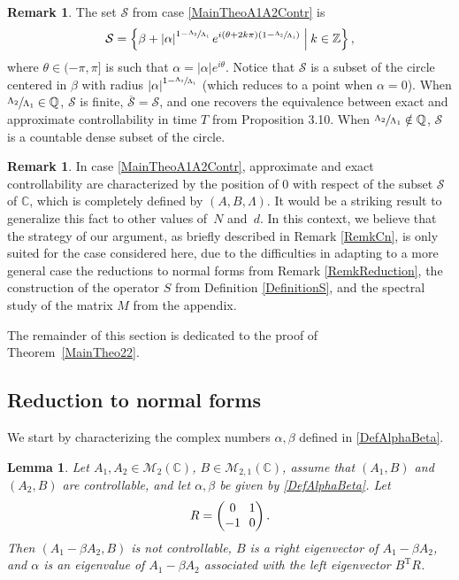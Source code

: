 \documentclass[JEP,XML,SOM,Unicode]{cedram}
\theoremstyle{plain}
\newtheorem{lemm}[theo]{Lemma}
\theoremstyle{definition}
\newtheorem{remk}[theo]{Remark}
\newcommand{\midsuchthat}{\;\middle|\:}
\newcommand{\transp}{{\scriptscriptstyle\mathrm{T}}}
\newcommand{\abs}[1]{\left\lvert #1\right \rvert}
\begin{document}
\begin{remk}
The set $\mathcal S$ from case \eqref{MainTheoA1A2Contr} is
\[
\mathcal S = \left\{\beta + \abs{\alpha}^{1 - \sfrac{\Lambda_2}{\Lambda_1}} e^{i (\theta + 2 k \pi)\left(1 - \sfrac{\Lambda_2}{\Lambda_1}\right)} \midsuchthat k \in \mathbb Z\right\},
\]
where $\theta \in (-\pi, \pi]$ is such that $\alpha = \abs{\alpha} e^{i\theta}$. Notice that $\mathcal S$ is a subset of the circle centered in $\beta$ with radius $\abs{\alpha}^{1 - \sfrac{\Lambda_2}{\Lambda_1}}$ (which reduces to a point when $\alpha = 0$). When $\sfrac{\Lambda_2}{\Lambda_1} \in \mathbb Q$, $\mathcal S$ is finite, $\overline{\mathcal S} = \mathcal S$, and one recovers the equivalence between exact and approximate controllability in time $T$ from Proposition 3.10. When $\sfrac{\Lambda_2}{\Lambda_1} \notin \mathbb Q$, $\mathcal S$ is a countable dense subset of the circle.
\end{remk}

\begin{remk}
In case \eqref{MainTheoA1A2Contr}, approximate and exact controllability are characterized by the position of $0$ with respect of the subset $\mathcal S$ of $\mathbb C$, which is completely defined by $(A, B, \Lambda)$. It would be a striking result to generalize this fact to other values of~$N$ and~$d$. In this context, we believe that the strategy of our argument, as briefly described in Remark \ref{RemkCn}, is only suited for the case considered here, due to the difficulties in adapting to a more general case the reductions to normal forms from Remark \ref{RemkReduction}, the construction of the operator $S$ from Definition \ref{DefinitionS}, and the spectral study of the matrix $M$ from the appendix.
\end{remk}

The remainder of this section is dedicated to the proof of Theorem~\ref{MainTheo22}.

\subsection{Reduction to normal forms}
\label{SecReduction}

We start by characterizing the complex numbers $\alpha, \beta$ defined in \eqref{DefAlphaBeta}.

\begin{lemm}
\label{LemmAlphaEigenvalue}
Let $A_1, A_2 \in \mathcal M_2(\mathbb C)$, $B \in \mathcal M_{2, 1}(\mathbb C)$, assume that $(A_1, B)$ and $(A_2, B)$ are controllable, and let $\alpha, \beta$ be given by \eqref{DefAlphaBeta}. Let
\begin{equation}
\label{DefR}\arraycolsep3.5pt
R = \begin{pmatrix}
0 & 1 \\
-1 & 0 \\
\end{pmatrix}.
\end{equation}
Then $(A_1 - \beta A_2, B)$ is not controllable, $B$ is a right eigenvector of $A_1 - \beta A_2$, and $\alpha$ is an eigenvalue of $A_1 - \beta A_2$ associated with the left eigenvector $B^\transp R$.
\end{lemm}
\end{document}
